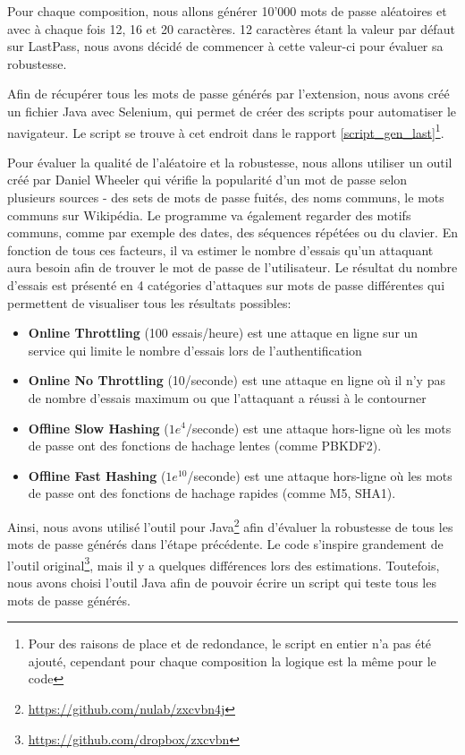 Pour chaque composition, nous allons générer 10'000 mots de passe aléatoires et avec à chaque fois 12, 16 et 20 caractères. 12 caractères étant la valeur par défaut sur LastPass, nous avons décidé de commencer à cette valeur-ci pour évaluer sa robustesse.

Afin de récupérer tous les mots de passe générés par l'extension, nous avons créé un fichier Java avec Selenium, qui permet de créer des scripts pour automatiser le navigateur. Le script se trouve à cet endroit dans le rapport \ref{script_gen_last}\footnote{Pour des raisons de place et de redondance, le script en entier n'a pas été ajouté, cependant pour chaque composition la logique est la même pour le code}. 

Pour évaluer la qualité de l'aléatoire et la robustesse, nous allons utiliser un outil créé par Daniel Wheeler\cite{197177} qui vérifie la popularité d'un mot de passe selon plusieurs sources - des sets de mots de passe fuités, des noms communs, le mots communs sur Wikipédia. Le programme va également regarder des motifs communs, comme par exemple des dates, des séquences répétées ou du clavier. En fonction de tous ces facteurs, il va estimer le nombre d'essais qu'un attaquant aura besoin afin de trouver le mot de passe de l'utilisateur. Le résultat du nombre d'essais est présenté en 4 catégories d'attaques sur mots de passe différentes qui permettent de visualiser tous les résultats possibles:

\begin{itemize}
	\item \textbf{Online Throttling} (100 essais/heure) est une attaque en ligne sur un service qui limite le nombre d'essais lors de l'authentification
	\item \textbf{Online No Throttling} (10/seconde) est une attaque en ligne où il n'y pas de nombre d'essais maximum ou que l'attaquant a réussi à le contourner
	\item \textbf{Offline Slow Hashing} ($1e^4$/seconde) est une attaque hors-ligne où les mots de passe ont des fonctions de hachage lentes (comme PBKDF2).
	\item \textbf{Offline Fast Hashing} ($1e^{10}$/seconde)	est une attaque hors-ligne où les mots de passe ont des fonctions de hachage rapides (comme M5, SHA1).
\end{itemize}

Ainsi, nous avons utilisé l'outil pour Java\footnote{\href{https://github.com/nulab/zxcvbn4j}{https://github.com/nulab/zxcvbn4j}} afin d'évaluer la robustesse de tous les mots de passe générés dans l'étape précédente. Le code s'inspire grandement de l'outil original\footnote{\href{https://github.com/dropbox/zxcvbn}{https://github.com/dropbox/zxcvbn}}, mais il y a quelques différences lors des estimations. Toutefois, nous avons choisi l'outil Java afin de pouvoir écrire un script qui teste tous les mots de passe générés.

